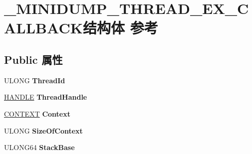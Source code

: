 \hypertarget{struct___m_i_n_i_d_u_m_p___t_h_r_e_a_d___e_x___c_a_l_l_b_a_c_k}{}\section{\+\_\+\+M\+I\+N\+I\+D\+U\+M\+P\+\_\+\+T\+H\+R\+E\+A\+D\+\_\+\+E\+X\+\_\+\+C\+A\+L\+L\+B\+A\+C\+K结构体 参考}
\label{struct___m_i_n_i_d_u_m_p___t_h_r_e_a_d___e_x___c_a_l_l_b_a_c_k}
\subsection*{Public 属性}
\begin{DoxyCompactItemize}
\item 
\mbox{\label{struct___m_i_n_i_d_u_m_p___t_h_r_e_a_d___e_x___c_a_l_l_b_a_c_k_ad6e4cc54ce6dc5c074a398b7dd2686de}} 
U\+L\+O\+NG {\bfseries Thread\+Id}
\item 
\mbox{\label{struct___m_i_n_i_d_u_m_p___t_h_r_e_a_d___e_x___c_a_l_l_b_a_c_k_ab85f18dbbfed9bce4268f4e76d704b25}} 
\hyperlink{interfacevoid}{H\+A\+N\+D\+LE} {\bfseries Thread\+Handle}
\item 
\mbox{\label{struct___m_i_n_i_d_u_m_p___t_h_r_e_a_d___e_x___c_a_l_l_b_a_c_k_ade5428b7ee3dbb7d60f8b007bf3777a6}} 
\hyperlink{struct___c_o_n_t_e_x_t}{C\+O\+N\+T\+E\+XT} {\bfseries Context}
\item 
\mbox{\label{struct___m_i_n_i_d_u_m_p___t_h_r_e_a_d___e_x___c_a_l_l_b_a_c_k_a633054920ae4592c417a4e7d157e7ce7}} 
U\+L\+O\+NG {\bfseries Size\+Of\+Context}
\item 
\mbox{\label{struct___m_i_n_i_d_u_m_p___t_h_r_e_a_d___e_x___c_a_l_l_b_a_c_k_a34dbd6ed3b7ad3c0766a924e9e8708d2}} 
U\+L\+O\+N\+G64 {\bfseries Stack\+Base}
\item 
\mbox{\label{struct___m_i_n_i_d_u_m_p___t_h_r_e_a_d___e_x___c_a_l_l_b_a_c_k_a3d12c408de2372ae094b715a28d0aa82}} 

\end{DoxyCompactItemize}
